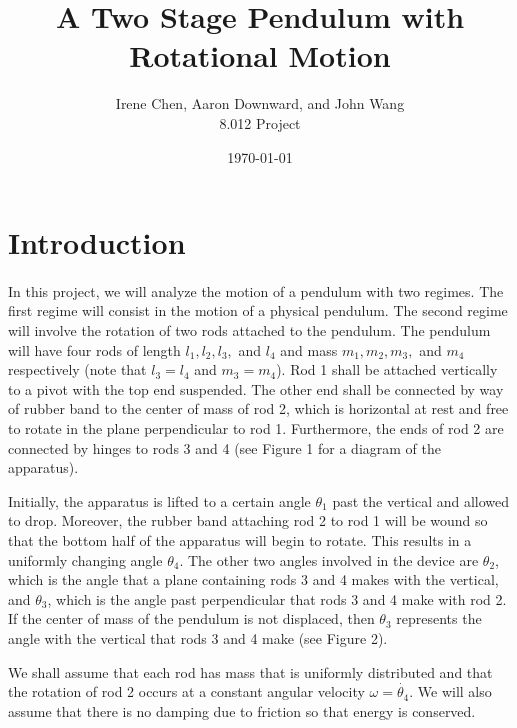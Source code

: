 \documentclass[12pt]{article}
\begin{document}
\title{A Two Stage Pendulum with Rotational Motion}
\date{\today}
\author{Irene Chen, Aaron Downward, and John Wang\\
8.012 Project\\}

\maketitle

\section{Introduction}


\paragraph{} In this project, we will analyze the motion of a pendulum with two regimes. The first regime will consist in the motion of a physical pendulum. The second regime will involve the rotation of two rods attached to the pendulum. The pendulum will have four rods of length $l_1,l_2,l_3,$ and $l_4$  and mass $m_1,m_2,m_3,$ and $m_4$ respectively (note that $l_3 = l_4$ and $m_3 = m_4$). Rod 1 shall be attached vertically to a pivot with the top end suspended. The other end shall be connected by way of rubber band to the center of mass of rod 2, which is horizontal at rest and free to rotate in the plane perpendicular to rod 1. Furthermore, the ends of rod 2 are connected by hinges to rods 3 and 4 (see Figure 1 for a diagram of the apparatus). 

Initially, the apparatus is lifted to a certain angle $\theta_1$ past the vertical and allowed to drop. Moreover, the rubber band attaching rod 2 to rod 1 will be wound so that the bottom half of the apparatus will begin to rotate. This results in a uniformly changing angle $\theta_4$. The other two angles involved in the device are $\theta_2$, which is the angle that a plane containing rods 3 and 4 makes with the vertical, and $\theta_3$, which is the angle past perpendicular that rods 3 and 4 make with rod 2. If the center of mass of the pendulum is not displaced, then $\theta_3$ represents the angle with the vertical that rods 3 and 4 make (see Figure 2).

We shall assume that each rod has mass that is uniformly distributed and that the rotation of rod 2 occurs at a constant angular velocity $\omega = \dot{\theta_4}$. We will also assume that there is no damping due to friction so that energy is conserved.
\end{document}
